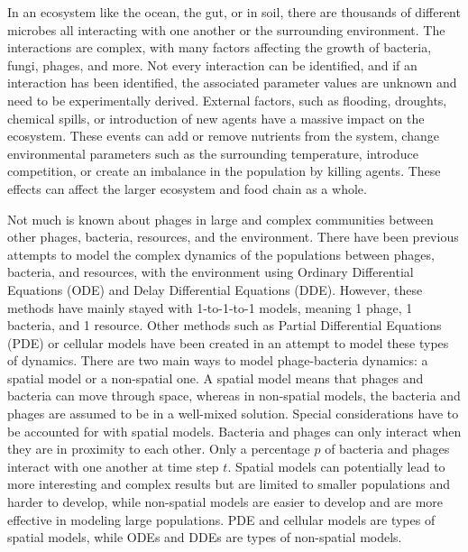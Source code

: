 In an ecosystem like the ocean, the gut, or in soil, there are thousands of different microbes all interacting with one another or the surrounding environment.
The interactions are complex, with many factors affecting the growth of bacteria, fungi,  phages, and more. 
Not every interaction can be identified, and if an interaction has been identified, the associated parameter values are unknown and need to be experimentally derived. 
External factors, such as flooding, droughts, chemical spills, or introduction of new agents have a massive impact on the ecosystem. 
These events can add or remove nutrients from the system, change environmental parameters such as the surrounding temperature, introduce competition, or create an imbalance in the population by killing agents. 
These effects can affect the larger ecosystem and food chain as a whole. \newline

Not much is known about phages in large and complex communities between other phages, bacteria, resources, and the environment. 
There have been previous attempts to model the complex dynamics of the populations between phages, bacteria, and resources, with the environment using Ordinary Differential Equations (ODE) and Delay Differential Equations (DDE).
However, these methods have mainly stayed with 1-to-1-to-1 models, meaning 1 phage, 1 bacteria, and 1 resource.
Other methods such as Partial Differential Equations (PDE) or cellular models have been created in an attempt to model these types of dynamics.
There are two main ways to model phage-bacteria dynamics: a spatial model or a non-spatial one.
A spatial model means that phages and bacteria can move through space, whereas in non-spatial models, the bacteria and phages are assumed to be in a well-mixed solution.
Special considerations have to be accounted for with spatial models.
Bacteria and phages can only interact when they are in proximity to each other.
Only a percentage $p$ of bacteria and phages interact with one another at time step $t$.
Spatial models can potentially lead to more interesting and complex results but are limited to smaller populations and harder to develop, while non-spatial models are easier to develop and are more effective in modeling large populations.
PDE and cellular models are types of spatial models, while ODEs and DDEs are types of non-spatial models. \newline 


